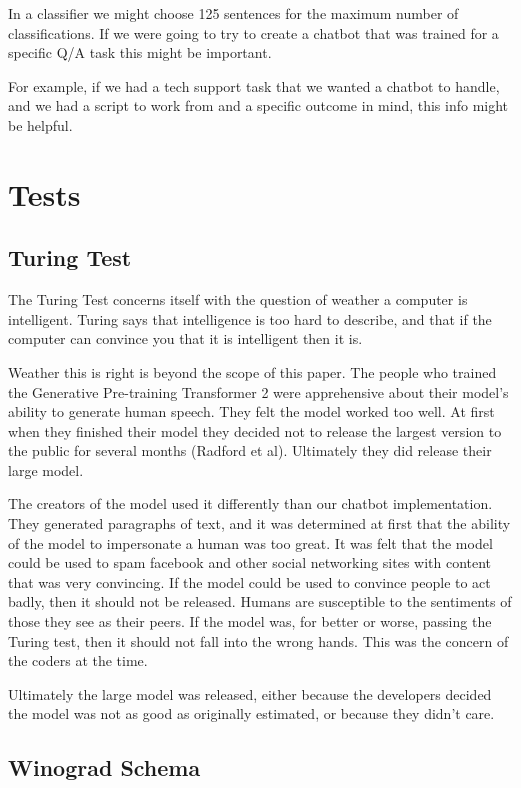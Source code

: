 In a classifier we might choose 125 sentences for the maximum number of classifications. If we were going to try to create a chatbot that was trained for a specific Q/A task this might be important.

For example, if we had a tech support task that we wanted a chatbot to handle, and we had a script to work from and a specific outcome in mind, this info might be helpful.

\section{Tests}

\subsection{Turing Test}

The Turing Test concerns itself with the question of weather a computer is intelligent. Turing says that intelligence is too hard to describe, and that if the computer can convince you that it is intelligent then it is.

Weather this is right is beyond the scope of this paper. The people who trained the Generative Pre-training Transformer 2 were apprehensive about their model's ability to generate human speech. They felt the model worked too well. At first when they finished their model they decided not to release the largest version to the public for several months (Radford et al)\cite{radford2019language}. Ultimately they did release their large model.

The creators of the model used it differently than our chatbot implementation. They generated paragraphs of text, and it was determined at first that the ability of the model to impersonate a human was too great. It was felt that the model could be used to spam facebook and other social networking sites with content that was very convincing. If the model could be used to convince people to act badly, then it should not be released. Humans are susceptible to the sentiments of those they see as their peers. If the model was, for better or worse, passing the Turing test, then it should not fall into the wrong hands. This was the concern of the coders at the time.

Ultimately the large model was released, either because the developers decided the model was not as good as originally estimated, or because they didn't care. 

\subsection{Winograd Schema}

